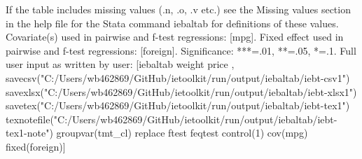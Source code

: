 If the table includes missing values (.n, .o, .v etc.) see the Missing values section in the help file for the Stata command iebaltab for definitions of these values. Covariate(s) used in pairwise and f-test regressions: [mpg]. Fixed effect used in pairwise and f-test regressions: [foreign]. Significance: ***=.01, **=.05, *=.1. Full user input as written by user: [iebaltab weight price , savecsv("C:/Users/wb462869/GitHub/ietoolkit/run/output/iebaltab/iebt-csv1") savexlsx("C:/Users/wb462869/GitHub/ietoolkit/run/output/iebaltab/iebt-xlsx1") savetex("C:/Users/wb462869/GitHub/ietoolkit/run/output/iebaltab/iebt-tex1") texnotefile("C:/Users/wb462869/GitHub/ietoolkit/run/output/iebaltab/iebt-tex1-note") groupvar(tmt\_cl) replace ftest feqtest control(1) cov(mpg) fixed(foreign)]
